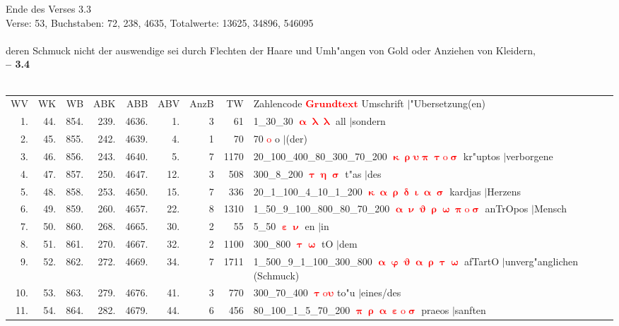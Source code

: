 \documentclass[a4paper,10pt,landscape]{article}
\begin{document}
Ende des Verses 3.3\\
Verse: 53, Buchstaben: 72, 238, 4635, Totalwerte: 13625, 34896, 546095\\
\\
deren Schmuck nicht der auswendige sei durch Flechten der Haare und Umh"angen von Gold oder Anziehen von Kleidern,\\
\newpage 
{\bf -- 3.4}\\
\medskip \\
\begin{tabular}{rrrrrrrrp{120mm}}
WV&WK&WB&ABK&ABB&ABV&AnzB&TW&Zahlencode \textcolor{red}{$\boldsymbol{Grundtext}$} Umschrift $|$"Ubersetzung(en)\\
1.&44.&854.&239.&4636.&1.&3&61&1\_30\_30 \textcolor{red}{$\boldsymbol{\upalpha\uplambda\uplambda}$} all $|$sondern\\
2.&45.&855.&242.&4639.&4.&1&70&70 \textcolor{red}{$\boldsymbol{\mathrm{o}}$} o $|$(der)\\
3.&46.&856.&243.&4640.&5.&7&1170&20\_100\_400\_80\_300\_70\_200 \textcolor{red}{$\boldsymbol{\upkappa\uprho\upsilon\uppi\uptau\mathrm{o}\upsigma}$} kr"uptos $|$verborgene\\
4.&47.&857.&250.&4647.&12.&3&508&300\_8\_200 \textcolor{red}{$\boldsymbol{\uptau\upeta\upsigma}$} t"as $|$des\\
5.&48.&858.&253.&4650.&15.&7&336&20\_1\_100\_4\_10\_1\_200 \textcolor{red}{$\boldsymbol{\upkappa\upalpha\uprho\updelta\upiota\upalpha\upsigma}$} kardjas $|$Herzens\\
6.&49.&859.&260.&4657.&22.&8&1310&1\_50\_9\_100\_800\_80\_70\_200 \textcolor{red}{$\boldsymbol{\upalpha\upnu\upvartheta\uprho\upomega\uppi\mathrm{o}\upsigma}$} anTrOpos $|$Mensch\\
7.&50.&860.&268.&4665.&30.&2&55&5\_50 \textcolor{red}{$\boldsymbol{\upepsilon\upnu}$} en $|$in\\
8.&51.&861.&270.&4667.&32.&2&1100&300\_800 \textcolor{red}{$\boldsymbol{\uptau\upomega}$} tO $|$dem\\
9.&52.&862.&272.&4669.&34.&7&1711&1\_500\_9\_1\_100\_300\_800 \textcolor{red}{$\boldsymbol{\upalpha\upvarphi\upvartheta\upalpha\uprho\uptau\upomega}$} afTartO $|$unverg"anglichen (Schmuck)\\
10.&53.&863.&279.&4676.&41.&3&770&300\_70\_400 \textcolor{red}{$\boldsymbol{\uptau\mathrm{o}\upsilon}$} to"u $|$eines/des\\
11.&54.&864.&282.&4679.&44.&6&456&80\_100\_1\_5\_70\_200 \textcolor{red}{$\boldsymbol{\uppi\uprho\upalpha\upepsilon\mathrm{o}\upsigma}$} praeos $|$sanften\\

\end{tabular}
\end{document}
